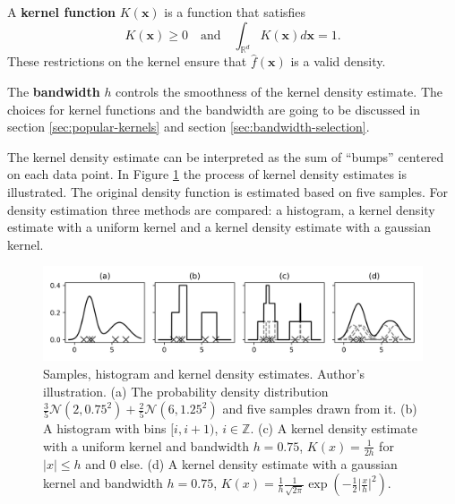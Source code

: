 \documentclass{article}
\begin{document}
A \textbf{kernel function} $K(\bm{x})$ is a function that satisfies
\begin{equation}
	K(\bm{x}) \geq 0\quad \text{and}\quad \int_{\mathbb{R}^d} K(\bm{x}) d\bm{x} = 1\text{.}
\end{equation}
These restrictions on the kernel ensure that $\hat{f}(\bm{x})$ is a valid density.

The \textbf{bandwidth} $h$ controls the smoothness of the kernel density estimate. The choices for kernel functions and the bandwidth are going to be discussed in section \ref{sec:popular-kernels} and section \ref{sec:bandwidth-selection}.

The kernel density estimate can be interpreted as the sum of ``bumps'' centered on each data point. In Figure \ref{fig:kde-kernel-density-estimates} the process of kernel density estimates is illustrated. The original density function is estimated based on five samples. For density estimation three methods are compared: a histogram, a kernel density estimate with a uniform kernel and a kernel density estimate with a gaussian kernel.

\begin{figure}
	\includegraphics[width=\textwidth]{figures/kde-kernel-density-estimates}
	\caption[Samples, histogram and kernel density estimates]{Samples, histogram and kernel density estimates. Author's illustration.
		(a) The probability density distribution $\frac{3}{5} \mathcal{N}\left(2, 0.75^2\right) + \frac{2}{5} \mathcal{N}\left(6, 1.25^2\right)$ and five samples drawn from it.
		(b) A histogram with bins $[i,i+1)$, $i \in \mathbb{Z}$.
		(c) A kernel density estimate with a uniform kernel and bandwidth $h=0.75$, $K(x) = \frac{1}{2h}$ for $\lvert x \rvert \leq h$ and $0$ else.
		(d) A kernel density estimate with a gaussian kernel and bandwidth $h=0.75$, $K(x) = \frac{1}{h} \frac{1}{\sqrt{2\pi}} \exp(-\frac{1}{2} \lvert \frac{x}{h} \rvert^2)$.
	}
	\label{fig:kde-kernel-density-estimates}
\end{figure}


\end{document}
